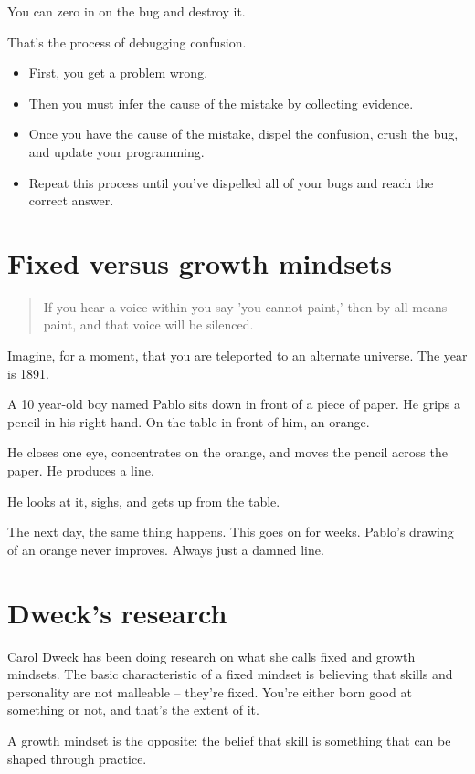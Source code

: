 You can zero in on the bug and destroy it.

That's the process of debugging confusion.

\begin{itemize}
\item First, you get a problem wrong.
\item Then you must infer the cause of the mistake by collecting evidence.
\item Once you have the cause of the mistake, dispel the confusion, crush the bug,
  and update your programming.
\item Repeat this process until you've dispelled all of your bugs and reach the
  correct answer.
\end{itemize}

\section{Fixed versus growth mindsets}

\begin{quote}
  If you hear a voice within you say 'you cannot paint,' then by all means
  paint, and that voice will be silenced.
\end{quote}

Imagine, for a moment, that you are teleported to an alternate universe. The
year is 1891.

A 10 year-old boy named Pablo sits down in front of a piece of paper. He grips a
pencil in his right hand. On the table in front of him, an orange.

He closes one eye, concentrates on the orange, and moves the pencil across the
paper. He produces a line.

He looks at it, sighs, and gets up from the table.

The next day, the same thing happens. This goes on for weeks. Pablo's drawing of
an orange never improves. Always just a damned line.

\section{Dweck's research}

Carol Dweck has been doing research on what she calls fixed and growth
mindsets. The basic characteristic of a fixed mindset is believing that skills
and personality are not malleable -- they're fixed. You're either born good at
something or not, and that's the extent of it.

A growth mindset is the opposite: the belief that skill is something that can be
shaped through practice.

